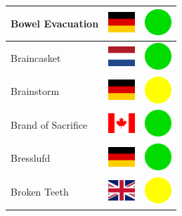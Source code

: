 \documentclass[12pt, a4paper, twoside]{report}
\begin{document}
\begin{center}
\begin{longtable}{|p{5cm}|p{2cm}|p{2cm}|}
 Bowel Evacuation                                           & \includegraphics[width=1cm]{../4x3/de} &   \includegraphics[width=1cm]{../likes/y} \\ \hline
 Braincasket                                                & \includegraphics[width=1cm]{../4x3/nl} &   \includegraphics[width=1cm]{../likes/y} \\ \hline
 Brainstorm                                                 & \includegraphics[width=1cm]{../4x3/de} &   \includegraphics[width=1cm]{../likes/m} \\ \hline
 Brand of Sacrifice                                         & \includegraphics[width=1cm]{../4x3/ca} &   \includegraphics[width=1cm]{../likes/y} \\ \hline
 Bresslufd                                                  & \includegraphics[width=1cm]{../4x3/de} &   \includegraphics[width=1cm]{../likes/y} \\ \hline
 Broken Teeth                                               & \includegraphics[width=1cm]{../4x3/gb} &   \includegraphics[width=1cm]{../likes/m} \\ \hline

\end{longtable}
\end{center}
\end{document}
